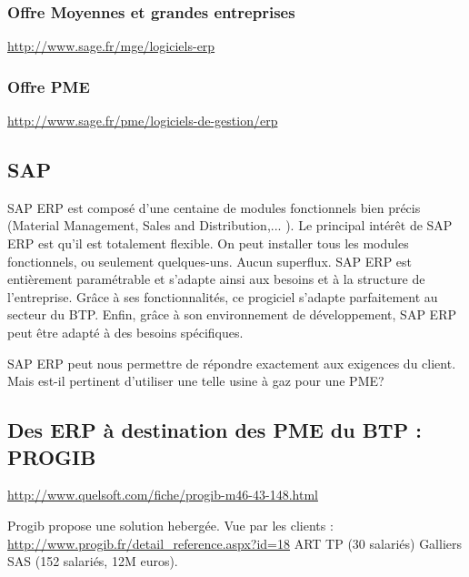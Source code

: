 \subsubsection{Offre Moyennes et grandes entreprises}
\url{http://www.sage.fr/mge/logiciels-erp}
\subsubsection{Offre PME}
\url{http://www.sage.fr/pme/logiciels-de-gestion/erp}

\subsection{SAP}

SAP ERP est composé d’une centaine de modules fonctionnels bien précis (Material Management, Sales and Distribution,... ). 
Le principal intérêt de SAP ERP est qu’il est totalement flexible. On peut installer tous les modules fonctionnels, ou seulement quelques-uns. 
Aucun superflux. SAP ERP est entièrement paramétrable et s'adapte ainsi aux besoins et à la structure de l'entreprise. 
Grâce à ses fonctionnalités, ce progiciel s’adapte parfaitement au secteur du BTP. 
Enfin, grâce à son environnement de développement, SAP ERP peut être adapté à des besoins spécifiques.

SAP ERP peut nous permettre de répondre exactement aux exigences du client. Mais est-il pertinent d'utiliser une telle usine à gaz pour une PME?  

\subsection{Des ERP à destination des PME du BTP : PROGIB}
\url{http://www.quelsoft.com/fiche/progib-m46-43-148.html}
 
Progib propose une solution hebergée.
Vue par les clients :
\url{http://www.progib.fr/detail_reference.aspx?id=18} ART TP (30 salariés)
Galliers SAS (152 salariés, 12M euros).